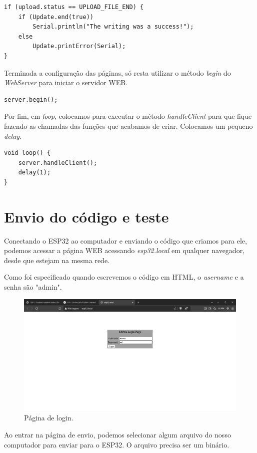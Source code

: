 \documentclass[12pt]{article}
\begin{document}
\begin{lstlisting}
if (upload.status == UPLOAD_FILE_END) {
    if (Update.end(true))             
        Serial.println("The writing was a success!");
    else
        Update.printError(Serial);
} 
\end{lstlisting}

Terminada a configuração das páginas, só resta utilizar o método \textit{begin} do \textit{WebServer} para iniciar o servidor WEB.

\begin{lstlisting}
server.begin();
\end{lstlisting}

Por fim, em \textit{loop}, colocamos para executar o método \textit{handleClient} para que fique fazendo as chamadas das funções que acabamos de criar. Colocamos um pequeno \textit{delay}.

\begin{lstlisting}
void loop() {
    server.handleClient();
    delay(1);
}
\end{lstlisting}

\section{Envio do código e teste}

Conectando o ESP32 ao computador e enviando o código que criamos para ele, podemos acessar a página WEB acessando \textit{esp32.local} em qualquer navegador, desde que estejam na mesma rede.

Como foi especificado quando escrevemos o código em HTML, o \textit{username} e a senha são "admin".

\begin{figure}[H]
    \centering
    \includegraphics[width=0.5\linewidth]{img/Captura de tela 2024-12-05 194630.jpg}
    \caption{Página de login.}
    \label{fig:loginIndex}
\end{figure}

Ao entrar na página de envio, podemos selecionar algum arquivo do nosso computador para enviar para o ESP32. O arquivo precisa ser um binário.
\end{document}
